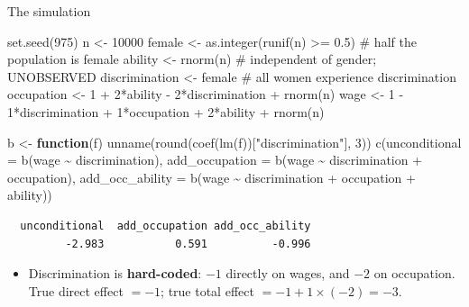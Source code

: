 \documentclass[
  11pt,
  ignorenonframetext,
  aspectratio=169,
]{beamer}
\newenvironment{Shaded}{\begin{snugshade}}{\end{snugshade}}
\newcommand{\AttributeTok}[1]{\textcolor[rgb]{0.40,0.45,0.13}{#1}}
\newcommand{\CommentTok}[1]{\textcolor[rgb]{0.37,0.37,0.37}{#1}}
\newcommand{\ControlFlowTok}[1]{\textcolor[rgb]{0.00,0.23,0.31}{\textbf{#1}}}
\newcommand{\DecValTok}[1]{\textcolor[rgb]{0.68,0.00,0.00}{#1}}
\newcommand{\FloatTok}[1]{\textcolor[rgb]{0.68,0.00,0.00}{#1}}
\newcommand{\FunctionTok}[1]{\textcolor[rgb]{0.28,0.35,0.67}{#1}}
\newcommand{\NormalTok}[1]{\textcolor[rgb]{0.00,0.23,0.31}{#1}}
\newcommand{\OtherTok}[1]{\textcolor[rgb]{0.00,0.23,0.31}{#1}}
\newcommand{\SpecialCharTok}[1]{\textcolor[rgb]{0.37,0.37,0.37}{#1}}
\newcommand{\StringTok}[1]{\textcolor[rgb]{0.13,0.47,0.30}{#1}}
\providecommand{\tightlist}{%
  \setlength{\itemsep}{0pt}\setlength{\parskip}{0pt}}
\begin{document}
\begin{frame}[fragile]{The simulation}
\protect{}\label{the-simulation}
\begin{Shaded}
\begin{Highlighting}[]
\FunctionTok{set.seed}\NormalTok{(}\DecValTok{975}\NormalTok{)}
\NormalTok{n              }\OtherTok{\textless{}{-}} \DecValTok{10000}
\NormalTok{female         }\OtherTok{\textless{}{-}} \FunctionTok{as.integer}\NormalTok{(}\FunctionTok{runif}\NormalTok{(n) }\SpecialCharTok{\textgreater{}=} \FloatTok{0.5}\NormalTok{)   }\CommentTok{\# half the population is female}
\NormalTok{ability        }\OtherTok{\textless{}{-}} \FunctionTok{rnorm}\NormalTok{(n)                      }\CommentTok{\# independent of gender; UNOBSERVED}
\NormalTok{discrimination }\OtherTok{\textless{}{-}}\NormalTok{ female                        }\CommentTok{\# all women experience discrimination}
\NormalTok{occupation     }\OtherTok{\textless{}{-}} \DecValTok{1} \SpecialCharTok{+} \DecValTok{2}\SpecialCharTok{*}\NormalTok{ability }\SpecialCharTok{{-}} \DecValTok{2}\SpecialCharTok{*}\NormalTok{discrimination }\SpecialCharTok{+} \FunctionTok{rnorm}\NormalTok{(n)}
\NormalTok{wage           }\OtherTok{\textless{}{-}} \DecValTok{1} \SpecialCharTok{{-}} \DecValTok{1}\SpecialCharTok{*}\NormalTok{discrimination }\SpecialCharTok{+} \DecValTok{1}\SpecialCharTok{*}\NormalTok{occupation }\SpecialCharTok{+} \DecValTok{2}\SpecialCharTok{*}\NormalTok{ability }\SpecialCharTok{+} \FunctionTok{rnorm}\NormalTok{(n)}

\NormalTok{b }\OtherTok{\textless{}{-}} \ControlFlowTok{function}\NormalTok{(f) }\FunctionTok{unname}\NormalTok{(}\FunctionTok{round}\NormalTok{(}\FunctionTok{coef}\NormalTok{(}\FunctionTok{lm}\NormalTok{(f))[}\StringTok{"discrimination"}\NormalTok{], }\DecValTok{3}\NormalTok{))}
\FunctionTok{c}\NormalTok{(}\AttributeTok{unconditional =} \FunctionTok{b}\NormalTok{(wage }\SpecialCharTok{\textasciitilde{}}\NormalTok{ discrimination),}
  \AttributeTok{add\_occupation =} \FunctionTok{b}\NormalTok{(wage }\SpecialCharTok{\textasciitilde{}}\NormalTok{ discrimination }\SpecialCharTok{+}\NormalTok{ occupation),}
  \AttributeTok{add\_occ\_ability =} \FunctionTok{b}\NormalTok{(wage }\SpecialCharTok{\textasciitilde{}}\NormalTok{ discrimination }\SpecialCharTok{+}\NormalTok{ occupation }\SpecialCharTok{+}\NormalTok{ ability))}
\end{Highlighting}
\end{Shaded}

\begin{verbatim}
  unconditional  add_occupation add_occ_ability 
         -2.983           0.591          -0.996 
\end{verbatim}

\begin{itemize}
\tightlist
\item
  Discrimination is \textbf{hard-coded}: \(-1\) directly on wages, and
  \(-2\) on occupation. True direct effect \(=-1\); true total effect
  \(= -1 + 1\times(-2) = -3\).
\end{itemize}
\end{frame}
\end{document}
